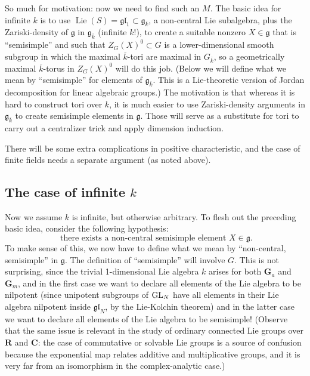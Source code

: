 \documentclass[10pt]{article}
\newcommand{\CC}{\mathbf{C}}
\newcommand{\RR}{\mathbf{R}}
\renewcommand{\(}{\left(}
\renewcommand{\)}{\right)}
\numberwithin{thm}{subsection}
\begin{document}
So much for motivation: now we need to find such an $M$. The basic idea for infinite
$k$ is to use $\operatorname{Lie}(S) = \mathfrak{gl}_1\subset \mathfrak{g}_{\overline{k}}$, a non-central Lie subalgebra, plus the Zariski-density 
of $\mathfrak{g}$ in $\mathfrak{g}_{\overline{k}}$ (infinite $k$!), 
to create a suitable nonzero $X\in \mathfrak{g}$ that is ``semisimple'' and 
such that $Z_G(X)^0 \subset G$ is a lower-dimensional smooth subgroup
in which the maximal $\overline{k}$-tori are maximal in $G_{\overline{k}}$, so
a geometrically maximal $\overline{k}$-torus in $Z_G(X)^0$ will do this job.
(Below we will define what we mean by ``semisimple'' for elements
of $\mathfrak{g}_{\overline{k}}$.  This is a Lie-theoretic version of
Jordan decomposition for linear algebraic groups.) 
The motivation is that whereas it is hard to construct tori over $k$, it is much easier to 
use Zariski-density arguments in $\mathfrak{g}_{\overline{k}}$ to
create semisimple elements in $\mathfrak{g}$.  Those will serve as a substitute for
tori to carry out a centralizer trick and apply dimension induction. 

There will be some extra complications in positive characteristic, and
the case of finite fields needs a separate argument (as noted above).  

\subsection{The case of infinite $k$}\label{infk}

Now we assume $k$ is infinite, but otherwise arbitrary.  
To flesh out the preceding basic idea, consider the following hypothesis:
\begin{equation*}\label{hypstar}\tag{$\star$}
\text{  there exists a non-central semisimple element $X\in \mathfrak{g}$.}
\end{equation*}
To make sense of this, we now have to define what we mean by
``non-central, semisimple'' in $\mathfrak{g}$.  The definition of ``semisimple'' will involve
$G$.  This is not surprising, since  the trivial 1-dimensional Lie algebra $k$ arises
for both $\mathbf{G}_a$ and $\mathbf{G}_m$, and in the first
case we want to declare all elements of the Lie algebra to be nilpotent
(since unipotent subgroups of ${\rm{GL}}_N$ have all elements in their Lie algebra nilpotent inside
$\mathfrak{gl}_N$, by  the Lie-Kolchin theorem) and in the latter case we want to declare all 
elements of the Lie algebra to be semisimple!  (Observe that the same issue is relevant in the study of 
ordinary connected Lie groups over $\RR$ and $\CC$:  the case of commutative or solvable Lie groups is
a source of confusion because the exponential map relates additive and multiplicative groups,
and it is very far from an isomorphism in the complex-analytic case.) 
\end{document}
